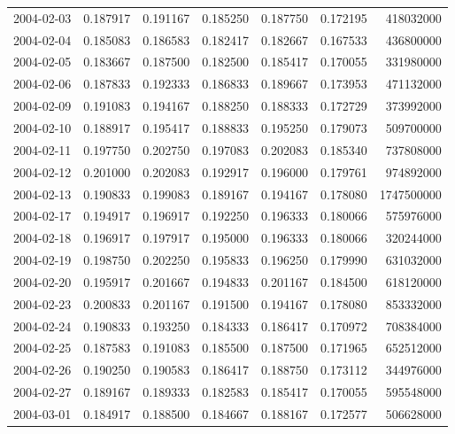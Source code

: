 \begin{tabular}{lrrrrrr}
2004-02-03 &    0.187917 &    0.191167 &    0.185250 &    0.187750 &    0.172195 &   418032000 \\
2004-02-04 &    0.185083 &    0.186583 &    0.182417 &    0.182667 &    0.167533 &   436800000 \\
2004-02-05 &    0.183667 &    0.187500 &    0.182500 &    0.185417 &    0.170055 &   331980000 \\
2004-02-06 &    0.187833 &    0.192333 &    0.186833 &    0.189667 &    0.173953 &   471132000 \\
2004-02-09 &    0.191083 &    0.194167 &    0.188250 &    0.188333 &    0.172729 &   373992000 \\
2004-02-10 &    0.188917 &    0.195417 &    0.188833 &    0.195250 &    0.179073 &   509700000 \\
2004-02-11 &    0.197750 &    0.202750 &    0.197083 &    0.202083 &    0.185340 &   737808000 \\
2004-02-12 &    0.201000 &    0.202083 &    0.192917 &    0.196000 &    0.179761 &   974892000 \\
2004-02-13 &    0.190833 &    0.199083 &    0.189167 &    0.194167 &    0.178080 &  1747500000 \\
2004-02-17 &    0.194917 &    0.196917 &    0.192250 &    0.196333 &    0.180066 &   575976000 \\
2004-02-18 &    0.196917 &    0.197917 &    0.195000 &    0.196333 &    0.180066 &   320244000 \\
2004-02-19 &    0.198750 &    0.202250 &    0.195833 &    0.196250 &    0.179990 &   631032000 \\
2004-02-20 &    0.195917 &    0.201667 &    0.194833 &    0.201167 &    0.184500 &   618120000 \\
2004-02-23 &    0.200833 &    0.201167 &    0.191500 &    0.194167 &    0.178080 &   853332000 \\
2004-02-24 &    0.190833 &    0.193250 &    0.184333 &    0.186417 &    0.170972 &   708384000 \\
2004-02-25 &    0.187583 &    0.191083 &    0.185500 &    0.187500 &    0.171965 &   652512000 \\
2004-02-26 &    0.190250 &    0.190583 &    0.186417 &    0.188750 &    0.173112 &   344976000 \\
2004-02-27 &    0.189167 &    0.189333 &    0.182583 &    0.185417 &    0.170055 &   595548000 \\
2004-03-01 &    0.184917 &    0.188500 &    0.184667 &    0.188167 &    0.172577 &   506628000 \\

\end{tabular}
